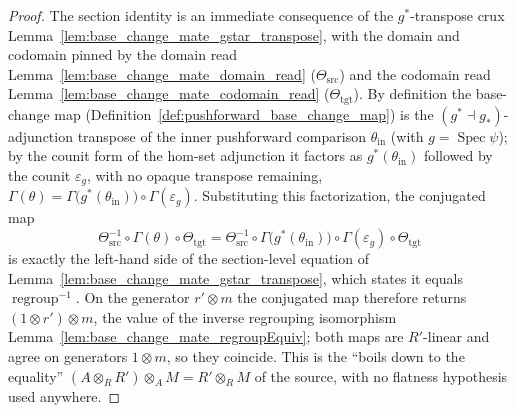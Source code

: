 \begin{proof}
  The section identity is an immediate consequence of the \(g^*\)-transpose crux
  Lemma~\ref{lem:base_change_mate_gstar_transpose}, with the domain and codomain pinned by
  the domain read Lemma~\ref{lem:base_change_mate_domain_read} (\(\Theta_{\mathrm{src}}\)) and
  the codomain read Lemma~\ref{lem:base_change_mate_codomain_read} (\(\Theta_{\mathrm{tgt}}\)).
  By definition the base-change map (Definition~\ref{def:pushforward_base_change_map}) is the
  \((g^* \dashv g_*)\)-adjunction transpose of the inner pushforward comparison
  \(\theta_{\mathrm{in}}\) (with \(g = \operatorname{Spec}\psi\)); by the counit form of the
  hom-set adjunction it factors as \(g^*(\theta_{\mathrm{in}})\) followed by the counit
  \(\varepsilon_g\), with no opaque transpose remaining,
  \(\Gamma(\theta) = \Gamma\bigl(g^*(\theta_{\mathrm{in}})\bigr) \circ \Gamma(\varepsilon_g)\).
  Substituting this factorization, the conjugated map
  \[
    \Theta_{\mathrm{src}}^{-1} \circ \Gamma(\theta) \circ \Theta_{\mathrm{tgt}}
      = \Theta_{\mathrm{src}}^{-1} \circ
        \Gamma\bigl(g^*(\theta_{\mathrm{in}})\bigr) \circ \Gamma(\varepsilon_g) \circ
        \Theta_{\mathrm{tgt}}
  \]
  is exactly the left-hand side of the section-level equation of
  Lemma~\ref{lem:base_change_mate_gstar_transpose}, which states it equals
  \(\operatorname{regroup}^{-1}\). On the generator \(r' \otimes m\) the conjugated map
  therefore returns \((1 \otimes r') \otimes m\), the value of the inverse regrouping
  isomorphism Lemma~\ref{lem:base_change_mate_regroupEquiv}; both maps are \(R'\)-linear and
  agree on generators \(1 \otimes m\), so they coincide. This is the ``boils down to the
  equality'' \((A \otimes_R R') \otimes_A M = R' \otimes_R M\) of the source, with no
  flatness hypothesis used anywhere.
\end{proof}

